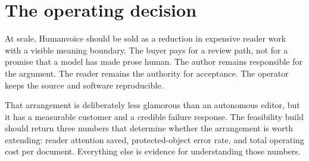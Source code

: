 \section{The operating decision}
\label{sec:ops-decision}

At scale, Humanvoice should be sold as a reduction in expensive reader work
with a visible meaning boundary. The buyer pays for a review path, not for a
promise that a model has made prose human. The author remains responsible for
the argument. The reader remains the authority for acceptance. The operator
keeps the source and software reproducible.

That arrangement is deliberately less glamorous than an autonomous editor,
but it has a measurable customer and a credible failure response. The
feasibility build should return three numbers that determine whether the
arrangement is worth extending: reader attention saved, protected-object error
rate, and total operating cost per document. Everything else is evidence for
understanding those numbers.
